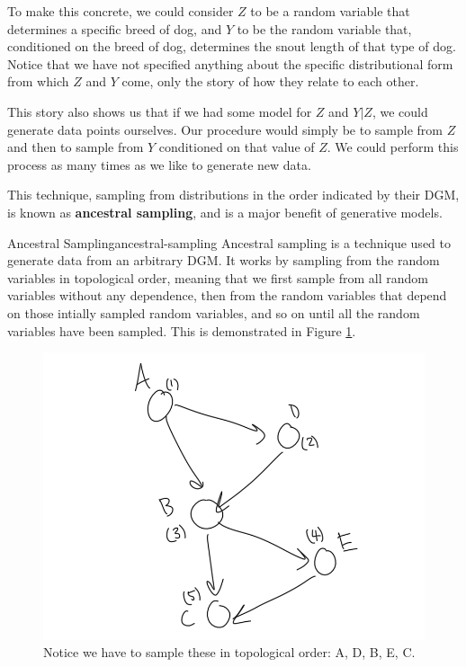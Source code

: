 To make this concrete, we could consider $Z$ to be a random variable that determines a specific breed of dog, and $Y$ to be the random variable that, conditioned on the breed of dog, determines the snout length of that type of dog. Notice that we have not specified anything about the specific distributional form from which $Z$ and $Y$ come, only the story of how they relate to each other.

This story also shows us that if we had some model for $Z$ and $Y|Z$, we could generate data points ourselves. Our procedure would simply be to sample from $Z$ and then to sample from $Y$ conditioned on that value of $Z$. We could perform this process as many times as we like to generate new data.

This technique, sampling from distributions in the order indicated by their DGM, is known as \textbf{ancestral sampling}, and is a major benefit of generative models.

\begin{definition}{Ancestral Sampling}{ancestral-sampling}
	Ancestral sampling is a technique used to generate data from an arbitrary DGM. It works by sampling from the random variables in topological order, meaning that we first sample from all random variables without any dependence, then from the random variables that depend on those intially sampled random variables, and so on until all the random variables have been sampled. This is demonstrated in Figure \ref{fig:ancestral-sampling}.
\end{definition}
\begin{figure}
	\centering
	\includegraphics[width=0.5\paperwidth]{../GraphicalModels/fig/AncestralSampling.png}
    \caption{Notice we have to sample these in topological order: A, D, B, E, C.}
	\label{fig:ancestral-sampling}
\end{figure}


